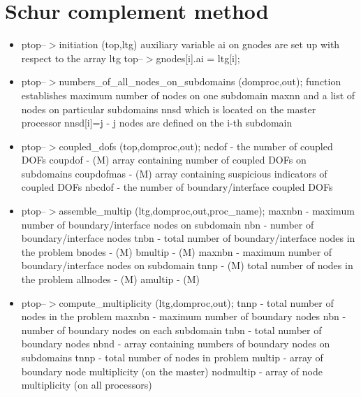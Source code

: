 \section{Schur complement method}

\begin{itemize}
\item
ptop--$>$initiation (top,ltg)
\newline
auxiliary variable ai on gnodes are set up with respect to the array ltg
top--$>$gnodes[i].ai = ltg[i];

\item
ptop--$>$numbers\_of\_all\_nodes\_on\_subdomains (domproc,out);
\newline
function establishes maximum number of nodes on one subdomain maxnn and a list
of nodes on particular subdomains nnsd which is located on the master processor
nnsd[i]=j - j nodes are defined on the i-th subdomain

\item
ptop--$>$coupled\_dofs (top,domproc,out);
\newline
   ncdof - the number of coupled DOFs
   coupdof - (M) array containing number of coupled DOFs on subdomains
   coupdofmas - (M) array containing suspicious indicators of coupled DOFs
   nbcdof - the number of boundary/interface coupled DOFs

\item
ptop--$>$assemble_multip (ltg,domproc,out,proc_name);
   maxnbn - maximum number of boundary/interface nodes on subdomain
   nbn - number of boundary/interface nodes
   tnbn - total number of boundary/interface nodes in the problem
   bnodes - (M)
   bmultip - (M)
   maxnbn - maximum number of boundary/interface nodes on subdomain
   tnnp - (M) total number of nodes in the problem
   allnodes - (M)
   amultip - (M) 







\item
ptop--$>$compute\_multiplicity (ltg,domproc,out);
\newline
tnnp - total number of nodes in the problem
maxnbn - maximum number of boundary nodes
nbn - number of boundary nodes on each subdomain
tnbn - total number of boundary nodes
nbnd - array containing numbers of boundary nodes on subdomains
tnnp - total number of nodes in problem
multip - array of boundary node multiplicity (on the master)
nodmultip - array of node multiplicity (on all processors)


\end{itemize}
